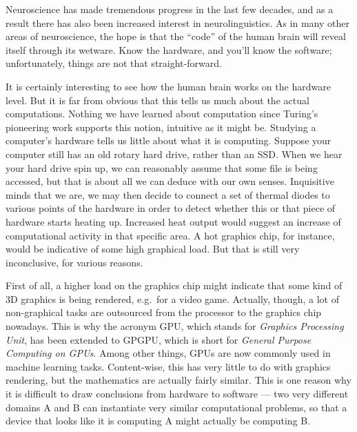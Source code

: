 Neuroscience has made tremendous progress in the last few decades, and as a result there has also been increased interest in neurolinguistics.
As in many other areas of neuroscience, the hope is that the ``code'' of the human brain will reveal itself through its wetware.
Know the hardware, and you'll know the software; unfortunately, things are not that straight-forward.

It is certainly interesting to see how the human brain works on the hardware level.
But it is far from obvious that this tells us much about the actual computations.
Nothing we have learned about computation since Turing's pioneering work supports this notion, intuitive as it might be.
Studying a computer's hardware tells us little about what it is computing.
Suppose your computer still has an old rotary hard drive, rather than an SSD\@.
When we hear your hard drive spin up, we can reasonably assume that some file is being accessed, but that is about all we can deduce with our own senses.
Inquisitive minds that we are, we may then decide to connect a set of thermal diodes to various points of the hardware in order to detect whether this or that piece of hardware starts heating up.
Increased heat output would suggest an increase of computational activity in that specific area.
A hot graphics chip, for instance, would be indicative of some high graphical load.
But that is still very inconclusive, for various reasons.

First of all, a higher load on the graphics chip might indicate that some kind of 3D graphics is being rendered, e.g.~for a video game.
Actually, though, a lot of non-graphical tasks are outsourced from the processor to the graphics chip nowadays.
This is why the acronym GPU, which stands for \emph{Graphics Processing Unit}, has been extended to GPGPU, which is short for \emph{General Purpose Computing on GPUs}.
Among other things, GPUs are now commonly used in machine learning tasks.
Content-wise, this has very little to do with graphics rendering, but the mathematics are actually fairly similar.
This is one reason why it is difficult to draw conclusions from hardware to software --- two very different domains A and B can instantiate very similar computational problems, so that a device that looks like it is computing A might actually be computing B\@.


